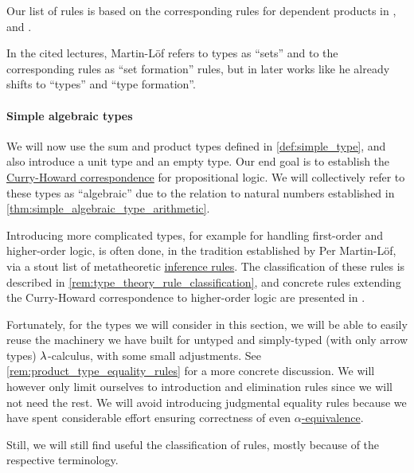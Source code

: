 \begin{comments}
  \item Our list of rules is based on the corresponding rules for dependent products in , \cite[\S A.2.4]{UnivalentFoundationsProgram2013HoTT} and \cite[\S 8.1.10]{Mimram2020ProgramEqualsProof}.

  \item In the cited lectures, Martin-L\"of refers to types as \enquote{sets} and to the corresponding rules as \enquote{set formation} rules, but in later works like \cite{MartinLöf1994TypeJudgments} he already shifts to \enquote{types} and \enquote{type formation}.
\end{comments}

\paragraph{Simple algebraic types}

\begin{remark}\label{rem:extended_simple_type_theory}
  We will now use the sum and product types defined in \cref{def:simple_type}, and also introduce a unit type and an empty type. Our end goal is to establish the \hyperref[con:curry_howard_correspondence]{Curry-Howard correspondence} for propositional logic. We will collectively refer to these types as \enquote{algebraic} due to the relation to natural numbers established in \cref{thm:simple_algebraic_type_arithmetic}.

  Introducing more complicated types, for example for handling first-order and higher-order logic, is often done, in the tradition established by Per Martin-L\"of, via a stout list of metatheoretic \hyperref[def:inference_rule]{inference rules}. The classification of these rules is described in \cref{rem:type_theory_rule_classification}, and concrete rules extending the Curry-Howard correspondence to higher-order logic are presented in .

  Fortunately, for the types we will consider in this section, we will be able to easily reuse the machinery we have built for untyped and simply-typed (with only arrow types) \( {\mathrm \lambda} \)-calculus, with some small adjustments. See \cref{rem:product_type_equality_rules} for a more concrete discussion. We will however only limit ourselves to introduction and elimination rules since we will not need the rest. We will avoid introducing judgmental equality rules because we have spent considerable effort ensuring correctness of even \hyperref[def:lambda_term_alpha_equivalence]{\( \alpha \)-equivalence}.

  Still, we will still find useful the classification of rules, mostly because of the respective terminology.
\end{remark}

